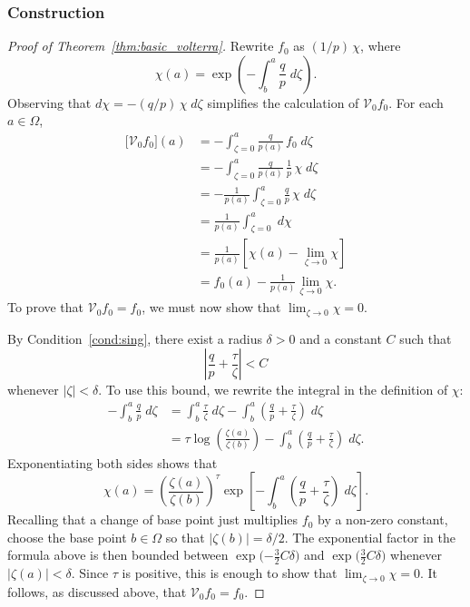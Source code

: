 \documentclass{article}
\theoremstyle{definition}
\theoremstyle{plain}
\newcommand{\hardpart}{\mathcal{V}_0}
\newcommand{\solproto}{f_0}
\newcommand{\domain}{\Omega}
\begin{document}
\subsubsection{Construction}\label{sec:construction}
\begin{proof}[Proof of Theorem~\ref{thm:basic_volterra}]
Rewrite $\solproto$ as $(1/p)\,\chi$, where
\[ \chi(a) = \exp\left(-\int_{b}^{a}\frac{q}{p}\;d\zeta\right). \]
Observing that $d\chi = -(q/p)\,\chi\;d\zeta$ simplifies the calculation of $\hardpart \solproto$. For each $a \in \domain$,
\begin{align*}
\big[\hardpart \solproto\big](a) &= - \int_{\zeta=0}^{a} \frac{q}{p(a)}\,\solproto\;d\zeta \\
& = -\int_{\zeta=0}^{a} \frac{q}{p(a)}\,\frac{1}{p}\,\chi\;d\zeta \\
& = - \frac{1}{p(a)}  \int_{\zeta=0}^{a} \frac{q}{p}\,\chi\;d\zeta\\
& = \frac{1}{p(a)} \int_{\zeta=0}^{a}\;d\chi \\
& = \frac{1}{p(a)} \left[ \chi(a) - \lim_{\zeta \to 0} \chi \right] \\
& = \solproto(a) - \frac{1}{p(a)} \lim_{\zeta \to 0} \chi.
\end{align*}
To prove that $\hardpart \solproto = \solproto$, we must now show that $\lim_{\zeta \to 0} \chi = 0$.

By Condition~\eqref{cond:sing}, there exist a radius $\delta>0$ and a constant $C$ such that
\begin{equation}\label{eqn:sing-bound}
\left|\frac{q}{p} + \frac{\tau}{\zeta}\right| < C
\end{equation}
whenever $|\zeta| < \delta$. To use this bound, we rewrite the integral in the definition of $\chi$:
\begin{align*}
-\int_b^a \frac{q}{p}\;d\zeta & = \int_b^a \frac{\tau}{\zeta}\;d\zeta - \int_b^a \left( \frac{q}{p} + \frac{\tau}{\zeta} \right)\;d\zeta \\
& = \tau \log\left(\frac{\zeta(a)}{\zeta(b)}\right) - \int_b^a \left( \frac{q}{p} + \frac{\tau}{\zeta} \right)\;d\zeta.
\end{align*}
Exponentiating both sides shows that
\[ \chi(a) = \left(\frac{\zeta(a)}{\zeta(b)}\right)^\tau \exp\left[-\int_b^a \left( \frac{q}{p} + \frac{\tau}{\zeta} \right)\;d\zeta\right]. \]
Recalling that a change of base point just multiplies $\solproto$ by a non-zero constant, choose the base point $b \in \Omega$ so that $|\zeta(b)| = \delta/2$. The exponential factor in the formula above is then bounded between $\exp\big({-\tfrac{3}{2}C\delta}\big)$ and $\exp\big(\tfrac{3}{2}C\delta\big)$ whenever $|\zeta(a)| < \delta$. Since $\tau$ is positive, this is enough to show that $\lim_{\zeta \to 0} \chi = 0$. It follows, as discussed above, that $\hardpart \solproto = \solproto$.
\end{proof}
\end{document}
